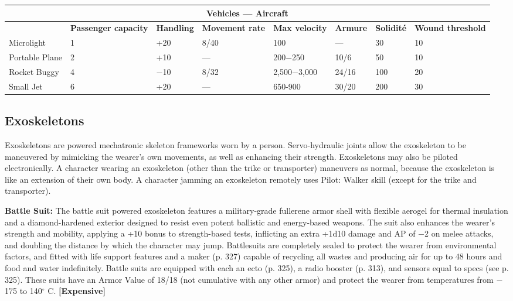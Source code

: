 \begin{table} \begin{tabularx}{\textwidth}{|X|X|X|X|X|l|l|X|} \hline

\multicolumn{8}{|c|}{\textbf{Vehicles --- Aircraft}} \\ \hline

&\textbf{Passenger capacity}	&\textbf{Handling}	&\textbf{Movement rate}	&\textbf{Max velocity}	&\textbf{Armure}	&\textbf{Solidité}	&\textbf{Wound threshold} \\ \hline

Microlight	&1	&+20	&8/40	&100	&--- &30	&10 \\ \hline

Portable Plane	&2	&+10	&--- &200$-$250	&10/6	&50	&10 \\ \hline

Rocket Buggy	&4	&$-$10	&8/32	&2,500$-$3,000	&24/16	&100	&20 \\ \hline

Small Jet	&6	&+20	&--- &650-900	&30/20	&200	&30 \\ \hline

\end{tabularx} \label{tab:aircraft} \end{table} 



\subsection{Exoskeletons} \label{sec:exoskeletons} 

Exoskeletons are powered mechatronic skeleton frameworks worn by a person. Servo-hydraulic joints allow the exoskeleton to be maneuvered by mimicking the wearer’s own movements, as well as enhancing their strength. Exoskeletons may also be piloted electronically. A character wearing an exoskeleton (other than the trike or transporter) maneuvers as normal, because the exoskeleton is like an extension of their own body. A character jamming an exoskeleton remotely uses Pilot: Walker skill (except for the trike and transporter). 

\textbf{Battle Suit:} The battle suit powered exoskeleton features a military-grade fullerene armor shell with flexible aerogel for thermal insulation and a diamond-hardened exterior designed to resist even potent ballistic and energy-based weapons. The suit also enhances the wearer’s strength and mobility, applying a +10 bonus to strength-based tests, inflicting an extra +1d10 damage and AP of $-$2 on melee attacks, and doubling the distance by which the character may jump. Battlesuits are completely sealed to protect the wearer from environmental factors, and fitted with life support features and a maker (p. 327) capable of recycling all wastes and producing air for up to 48 hours and food and water indefinitely. Battle suits are equipped with each an ecto (p. 325), a radio booster (p. 313), and sensors equal to specs (see p. 325). These suits have an Armor Value of 18/18 (not cumulative with any other armor) and protect the wearer from temperatures from $-$175 to 140$^{\circ}$ C. \textbf{[Expensive]} 

